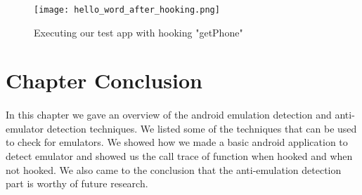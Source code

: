 \documentclass[../main.tex]{subfile}
\begin{document}
		\begin{figure}
			\centering
			\texttt{[image: hello\_word\_after\_hooking.png]}
			\caption{Executing our test app with hooking  "getPhone"}
			\label{fig:hooking_execute}			
		\end{figure}	
	
	
	\section{Chapter Conclusion}
	\paragraph{} In this chapter we gave an overview of the android emulation detection and anti-emulator detection techniques. We listed some of the techniques that can be used to check for emulators. We showed how we made a basic android application to detect emulator and showed us the call trace of function when hooked and when not hooked. We also came to the conclusion that the anti-emulation detection part is worthy of future research.
			
\end{document}
